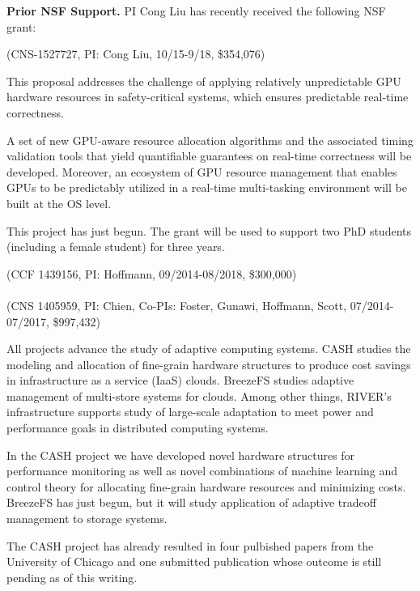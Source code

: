 \noindent \textbf{Prior NSF Support.} PI Cong Liu  has recently received the following NSF grant:

 (CNS-1527727, PI: Cong Liu, 10/15-9/18, \$354,076)

This proposal addresses the challenge of applying relatively unpredictable GPU hardware resources in
safety-critical systems, which ensures predictable real-time correctness.

 A set of new GPU-aware
resource allocation algorithms and the associated timing validation tools that yield quantifiable guarantees on
real-time correctness will be developed. Moreover, an ecosystem of GPU
resource management that enables GPUs to be predictably utilized in a
real-time multi-tasking environment will be built at the OS level. 

 This project has just begun.  The grant will be used to support two PhD students (including a female student) for three years.

 (CCF 1439156, PI: Hoffmann, 09/2014-08/2018, \$300,000)\\
 \\
 (CNS 1405959, PI:
Chien, Co-PIs: Foster, Gunawi, Hoffmann, Scott, 07/2014-07/2017,
\$997,432)

All projects advance the study of adaptive computing systems.  CASH
studies the modeling and allocation of fine-grain hardware structures
to produce cost savings in infrastructure as a service (IaaS) clouds.
BreezeFS studies adaptive management of multi-store systems for
clouds.  Among other things, RIVER's infrastructure supports study of
large-scale adaptation to meet power and performance goals in
distributed computing systems.  

 In the CASH project we have
developed novel hardware structures for performance monitoring as well
as novel combinations of machine learning and control theory for
allocating fine-grain hardware resources and minimizing costs.
BreezeFS has just begun, but it will study application of adaptive
tradeoff management to storage systems.

 The CASH project has already resulted
in four pulbished papers from the University of Chicago
\cite{kim-cpsna,POET,FSE2015,JouleGuard} and one submitted publication
whose outcome is still pending as of this writing.